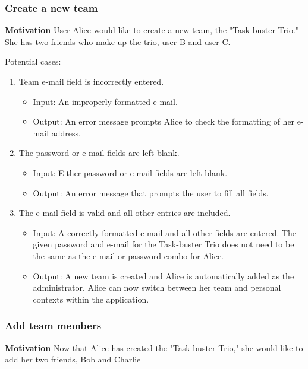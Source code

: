 \documentclass{article}
\begin{document}
\subsubsection{Create a new team}
\textbf{Motivation} User Alice would like to create a new team, the
"Task-buster Trio." She has two friends who make up the trio, user B 
and user C.

Potential cases:
\begin{enumerate}
    \item Team e-mail field is incorrectly entered.
        \begin{itemize}
            \item Input: An improperly formatted e-mail.
            \item Output: An error message prompts Alice to check the
formatting of her e-mail address.
        \end{itemize}
    \item The password or e-mail fields are left blank.
        \begin{itemize}
            \item Input: Either password or e-mail fields are left blank.
            \item Output: An error message that prompts the user to fill all
fields.
        \end{itemize}
    \item The e-mail field is valid and all other entries are included.
        \begin{itemize}
            \item Input: A correctly formatted e-mail and all other fields are
entered. The given password and e-mail for the Task-buster Trio does not need
to be the same as the e-mail or password combo for Alice.
            \item Output: A new team is created and Alice is
automatically added as the administrator.
                Alice can now switch between her team and personal
contexts within the application.
        \end{itemize}
\end{enumerate}

\subsubsection{Add team members}
\textbf{Motivation} Now that Alice has created the "Task-buster
Trio," she would like to add her two friends, Bob and Charlie
\end{document}
